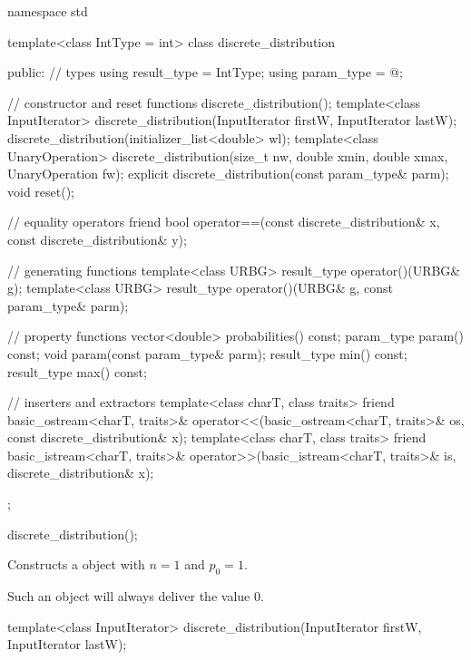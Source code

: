 %
%
\begin{codeblock}
namespace std {
  template<class IntType = int>
  class discrete_distribution {
  public:
    // types
    using result_type = IntType;
    using param_type  = @\unspec@;

    // constructor and reset functions
    discrete_distribution();
    template<class InputIterator>
      discrete_distribution(InputIterator firstW, InputIterator lastW);
    discrete_distribution(initializer_list<double> wl);
    template<class UnaryOperation>
      discrete_distribution(size_t nw, double xmin, double xmax, UnaryOperation fw);
    explicit discrete_distribution(const param_type& parm);
    void reset();

    // equality operators
    friend bool operator==(const discrete_distribution& x, const discrete_distribution& y);

    // generating functions
    template<class URBG>
      result_type operator()(URBG& g);
    template<class URBG>
      result_type operator()(URBG& g, const param_type& parm);

    // property functions
    vector<double> probabilities() const;
    param_type param() const;
    void param(const param_type& parm);
    result_type min() const;
    result_type max() const;

    // inserters and extractors
    template<class charT, class traits>
      friend basic_ostream<charT, traits>&
        operator<<(basic_ostream<charT, traits>& os, const discrete_distribution& x);
    template<class charT, class traits>
      friend basic_istream<charT, traits>&
        operator>>(basic_istream<charT, traits>& is, discrete_distribution& x);
  };
}
\end{codeblock}

\begin{itemdecl}
discrete_distribution();
\end{itemdecl}

\begin{itemdescr}
\pnum
\effects
Constructs a  object
with $n = 1$ and $p_0 = 1$.
\begin{note}
Such an object will always deliver the value $0$.
\end{note}
\end{itemdescr}


%
\begin{itemdecl}
template<class InputIterator>
  discrete_distribution(InputIterator firstW, InputIterator lastW);
\end{itemdecl}

